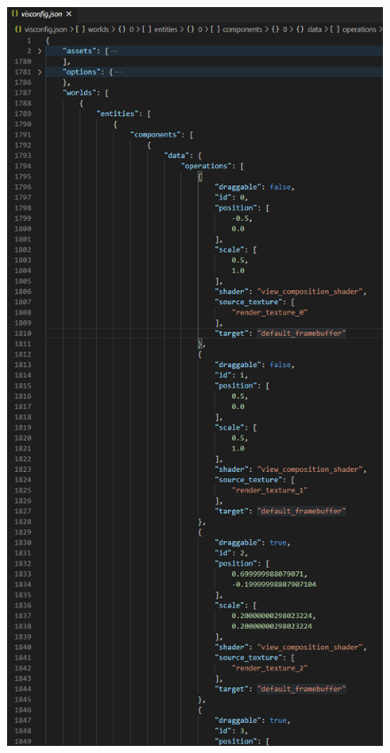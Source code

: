 \documentclass{presentation}
\begin{document}
\begin{frame}
\begin{columns}
\begin{figure}
			\includegraphics[scale=0.18]{images/konfiguration_stencil_visualizer.png}
		\end{figure}
	\end{columns}
\end{frame}
\end{document}
